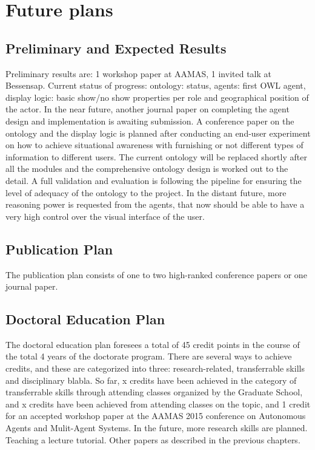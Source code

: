 \chapter{Future plans}
\section{Preliminary and Expected Results}

Preliminary results are: 1 workshop paper at AAMAS, 1 invited talk at Bessensap. 
Current status of progress: ontology: status, agents: first OWL agent, display logic: basic show/no show properties per role and geographical position of the actor. 
In the near future, another journal paper on completing the agent design and implementation is awaiting submission. A conference paper on the ontology and the display logic is planned after conducting an end-user experiment on how to achieve situational awareness with furnishing or not different types of information to different users. The current ontology will be replaced shortly after all the modules and the comprehensive ontology design is worked out to the detail. A full validation and evaluation is following the pipeline for ensuring the level of adequacy of the ontology to the project.
In the distant future, more reasoning power is requested from the agents, that now should be able to have a very high control over the visual interface of the user. 

\section{Publication Plan}

The publication plan consists of one to two high-ranked conference papers or one journal paper. 

\section{Doctoral Education Plan}
The doctoral education plan foresees a total of 45 credit points in the course of the total 4 years of the doctorate program. There are several ways to achieve credits, and these are categorized into three: research-related, transferrable skills and disciplinary blabla. So far, x credits have been achieved in the category of transferrable skills through attending classes organized by the Graduate School, and x credits have been achieved from attending classes on the topic, and 1 credit for an accepted workshop paper at the AAMAS 2015 conference on Autonomous Agents and Mulit-Agent Systems.
In the future, more research skills are planned.
Teaching a lecture tutorial.
Other papers as described in the previous chapters.

  
  